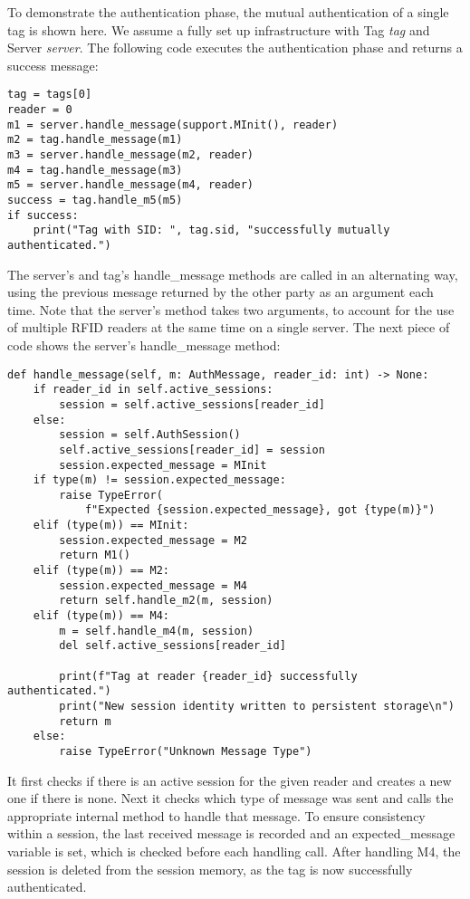 To demonstrate the authentication phase, the mutual authentication of a single tag is shown here.
We assume a fully set up infrastructure with Tag \emph{tag} and Server \emph{server}.
The following code executes the authentication phase and returns a success message:

\begin{lstlisting}
tag = tags[0]
reader = 0
m1 = server.handle_message(support.MInit(), reader)
m2 = tag.handle_message(m1)
m3 = server.handle_message(m2, reader)
m4 = tag.handle_message(m3)
m5 = server.handle_message(m4, reader)
success = tag.handle_m5(m5)
if success:
    print("Tag with SID: ", tag.sid, "successfully mutually authenticated.") 
\end{lstlisting}

The server's and tag's handle\_message methods are called in an alternating way,
using the previous message returned by the other party as an argument each time.
Note that the server's method takes two arguments, to account for the use of multiple
RFID readers at the same time on a single server.
The next piece of code shows the server's handle\_message method:

\begin{lstlisting}
def handle_message(self, m: AuthMessage, reader_id: int) -> None:
    if reader_id in self.active_sessions:
        session = self.active_sessions[reader_id]
    else:
        session = self.AuthSession()
        self.active_sessions[reader_id] = session
        session.expected_message = MInit
    if type(m) != session.expected_message:
        raise TypeError(
            f"Expected {session.expected_message}, got {type(m)}")
    elif (type(m)) == MInit:
        session.expected_message = M2
        return M1()
    elif (type(m)) == M2:
        session.expected_message = M4
        return self.handle_m2(m, session)
    elif (type(m)) == M4:
        m = self.handle_m4(m, session)
        del self.active_sessions[reader_id]
    
        print(f"Tag at reader {reader_id} successfully authenticated.")
        print("New session identity written to persistent storage\n")
        return m
    else:
        raise TypeError("Unknown Message Type")

\end{lstlisting}

It first checks if there is an active session for the given reader and creates a new one if there is none.
Next it checks which type of message was sent and calls the appropriate internal method to handle
that message. To ensure consistency within a session, the last received message is recorded and
an expected\_message variable is set, which is checked before each handling call.
After handling M4, the session is deleted from the session memory, as the tag is now successfully authenticated.

